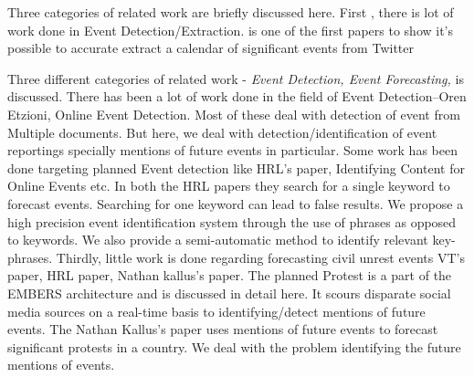 Three categories of related work are briefly discussed here. First , there is lot of work done in Event Detection/Extraction. \cite{Ritter:2012} is one of the first papers to show it's possible to accurate extract a calendar of significant events from Twitter

Three different categories of related work - \emph{Event Detection, Event Forecasting, } is discussed. There has been a lot of work done in the field of Event Detection--Oren Etzioni, Online Event Detection. Most of these deal with detection of event from Multiple documents. But here, we deal with detection/identification of event reportings specially mentions of future events in particular. Some work has been done targeting planned Event detection like HRL's paper, Identifying Content for Online Events etc. In both the HRL papers they search for a single keyword to forecast events. Searching for one keyword can lead to false results. We propose a high precision event identification system through the use of phrases as opposed to keywords. We also provide a semi-automatic method to identify relevant key-phrases. 
Thirdly, little work is done regarding forecasting civil unrest events {VT's paper, HRL paper, Nathan kallus's paper}. The planned Protest is a part of the EMBERS architecture and is discussed in detail here. It scours disparate social media sources on a real-time basis to identifying/detect mentions of future events. The Nathan Kallus's paper uses mentions of future events to forecast significant protests in a country. We deal with the problem identifying the future mentions of events.


